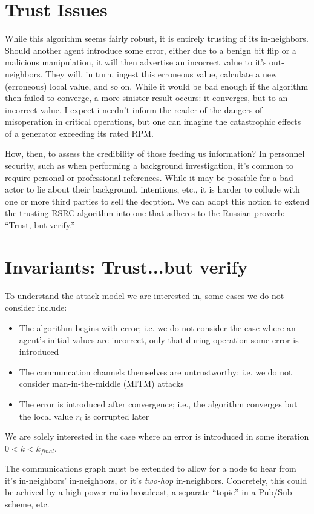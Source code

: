 \documentclass[11pt]{article}
\begin{document}
\section{Trust Issues}
While this algorithm seems fairly robust, it is entirely trusting of its
in-neighbors.  Should another agent introduce some error, either due to a benign
bit flip or a malicious manipulation, it will then advertise an incorrect value
to it's out-neighbors. They will, in turn, ingest this erroneous value,
calculate a new (erroneous) local value, and so on.  While it would be bad
enough if the algorithm then failed to converge, a more sinister result occurs:
it converges, but to an incorrect value. I expect i needn't inform the reader of
the dangers of misoperation in critical operations, but one can imagine the
catastrophic effects of a generator exceeding its rated RPM.

How, then, to assess the credibility of those feeding us information? In
personnel security, such as when performing a background investigation, it's
common to require personal or professional references. While it may be possible
for a bad actor to lie about their background, intentions, etc., it is harder to
collude with one or more third parties to sell the decption. We can adopt this
notion to extend the trusting RSRC algorithm into one that adheres to the
Russian proverb: ``Trust, but verify.''

\section{Invariants: Trust...but verify}
To understand the attack model we are interested in, some cases we do not consider include:
\begin{itemize}
    \item The algorithm begins with error; i.e. we do not consider the case
          where an agent's initial values are incorrect, only that during operation
          some error is introduced
    \item The communcation channels themselves are untrustworthy; i.e. we do not
          consider man-in-the-middle (MITM) attacks
    \item The error is introduced after convergence; i.e., the algorithm
          converges but the local value $r_i$ is corrupted later
\end{itemize}
We are solely interested in the case where an error is introduced in some iteration $0<k<k_{final}$.

The communications graph must be extended to allow for a node to hear from it's
in-neighbors' in-neighbors, or it's \textit{two-hop} in-neighbors. Concretely,
this could be achived by a high-power radio broadcast, a separate ``topic'' in a
Pub/Sub scheme, etc.
\end{document}
